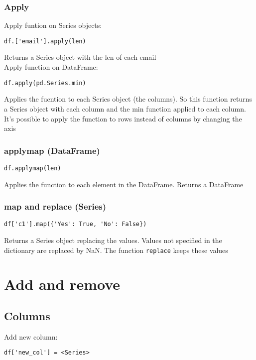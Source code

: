 \documentclass[french]{article}
\begin{document}
\subsubsection{Apply}

Apply funtion on Series objects:
\begin{verbatim}
df.['email'].apply(len)
\end{verbatim}
Returns a Series object with the len of each email\\

Apply function on DataFrame:
\begin{verbatim}
df.apply(pd.Series.min)
\end{verbatim}
Applies the fucntion to each Series object (the columns). So this function returns a Series object with each column and the min function applied to each column.\\

It's possible to apply the function to rows instead of columns by changing the axis

\subsubsection{applymap (DataFrame)}
\begin{verbatim}
df.applymap(len)
\end{verbatim}

Applies the function to each element in the DataFrame. Returns a DataFrame

\subsubsection{map and replace (Series)}
\begin{verbatim}
df['c1'].map({'Yes': True, 'No': False})
\end{verbatim}
Returns a Series object replacing the values. Values not specified in the dictionary are replaced by NaN. The function \verb|replace| keeps these values

\section{Add and remove}

\subsection{Columns}

Add new column:
\begin{verbatim}
df['new_col'] = <Series>
\end{verbatim}
\end{document}
